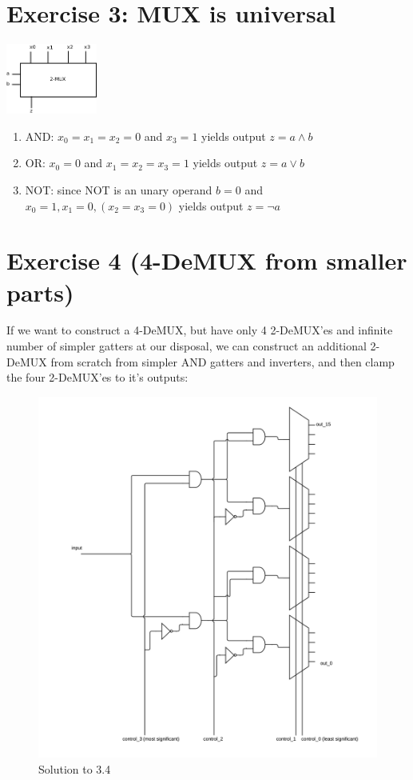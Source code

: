 \documentclass[10pt,a4paper]{scrartcl}
\begin{document}
\section*{Exercise 3: MUX is universal}

\includegraphics[width=3cm]{images/3-3.png}
\begin{enumerate}
 \item AND: $x_0=x_1=x_2=0$ and $x_3 = 1$ yields output $z = a \land b$
 \item OR: $x_0 = 0$ and $x_1=x_2=x_3= 1$ yields output $z = a \lor b$
 \item NOT: since NOT is an unary operand $b=0$ and $x_0=1, x_1=0, (x_2=x_3=0)$ yields output $z = \lnot a$
\end{enumerate}

\section*{Exercise 4 (4-DeMUX from smaller parts)}
If we want to construct a 4-DeMUX, but have only 4 2-DeMUX'es and infinite number of
simpler gatters at our disposal, we can construct an additional 2-DeMUX from scratch
from simpler AND gatters and inverters, and then clamp the four 2-DeMUX'es to it's 
outputs:
\vspace{1em}
\begin{figure}[h]
  \centering\includegraphics[width=\linewidth]{images/exercise_3_4.png}
  \caption{Solution to 3.4}
\end{figure}
\vspace{1em}
\end{document}
